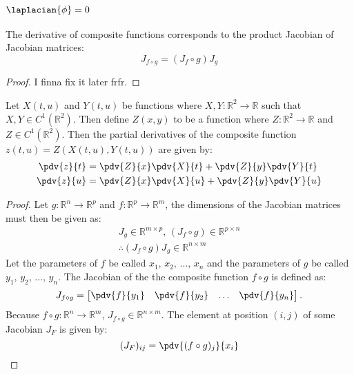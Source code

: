 \subsubsection{$\laplacian{\phi}=0$}\label{sec:deltaphizero}
\begin{lemma}
	The derivative of composite functions corresponds to the product Jacobian of Jacobian matrices:
	$$J_{f\circ g}=(J_f\circ g)J_g$$
\end{lemma}
\begin{proof}
	I finna fix it later frfr.
\end{proof}

\begin{lemma}
Let $X(t,u)$ and $Y(t,u)$ be functions where $X,Y:\mathbb{R}^2\rightarrow\mathbb{R}$ such that $X,Y\in C^1(\mathbb{R}^2)$. Then define $Z(x,y)$ to be a function where $Z:\mathbb{R}^2\rightarrow\mathbb{R}$ and $Z\in C^1(\mathbb{R}^2)$. Then the partial derivatives of the composite function $z(t,u)=Z(X(t,u),Y(t,u))$ are given by:
\begin{align*}
	\pdv{z}{t}&=\pdv{Z}{x}\pdv{X}{t}+\pdv{Z}{y}\pdv{Y}{t}\\
	\pdv{z}{u}&=\pdv{Z}{x}\pdv{X}{u}+\pdv{Z}{y}\pdv{Y}{u}
\end{align*}
\begin{proof}
	Let $g:\mathbb{R}^n\rightarrow\mathbb{R}^p$ and $f:\mathbb{R}^p\rightarrow\mathbb{R}^m$, the dimensions of the Jacobian matrices must then be given as:
	\begin{gather*}
		J_g\in\mathbb{R}^{m\times p},\,(J_f\circ g)\in\mathbb{R}^{p\times n}\\
		\therefore(J_f\circ g)J_g\in\mathbb{R}^{n\times m}
	\end{gather*}
	Let the parameters of $f$ be called $x_1,\,x_2,\,\hdots,\,x_n$ and the parameters of $g$ be called $y_1,\,y_2,\,\hdots,\,y_n$. The Jacobian of the the composite function $f\circ g$ is defined as:
	\begin{gather*}
		J_{f\circ g}=\begin{bmatrix}
			\pdv{f}{y_1}&\pdv{f}{y_2}&\hdots&\pdv{f}{y_n}
		\end{bmatrix}.
	\end{gather*}
	Because $f\circ g:\mathbb{R}^n\rightarrow\mathbb{R}^m$, $J_{f\circ g}\in\mathbb{R}^{n\times m}$. The element at position $(i,j)$ of some Jacobian $J_F$ is given by:
	\begin{equation}
		\label{chainrule:1}(J_F)_{ij}=\pdv{(f\circ g)_j}{x_i}\\

\end{equation}
\end{proof}
\end{lemma}
